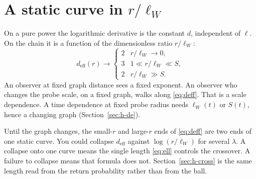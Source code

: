 \section{\texorpdfstring{A static curve in \(r/\ell_W\)}{A static curve in r/ellW}}
\label{sec:h-dimevol}

On a pure power the logarithmic derivative is the constant \(d\),
independent of \(\ell\).
On the chain it is a function of the dimensionless ratio \(r/\ell_W\):
\begin{equation}
\label{eq:deff}
d_{\mathrm{eff}}(r)\to
\begin{cases}
2 & r/\ell_W\to 0,\\
3 & 1\ll r/\ell_W\ll S,\\
2 & r/\ell_W\gg S.
\end{cases}
\end{equation}
An observer at fixed graph distance sees a fixed exponent.
An observer who changes the probe scale, on a fixed graph, walks along
\eqref{eq:deff}.
That is a scale dependence.
A time dependence at fixed probe radius needs \(\ell_W(t)\) or \(S(t)\),
hence a changing graph (Section~\ref{sec:h-de}).

Until the graph changes, the small-\(r\) and large-\(r\) ends of
\eqref{eq:deff} are two ends of one static curve.
You could collapse \(d_{\mathrm{eff}}\) against \(\log(r/\ell_W)\) for
several \(\lambda\).
A collapse onto one curve means the single length \eqref{eq:ell} controls
the crossover.
A failure to collapse means that formula does not.
Section~\ref{sec:h-cross} is the same length read from the return
probability rather than from the ball.
